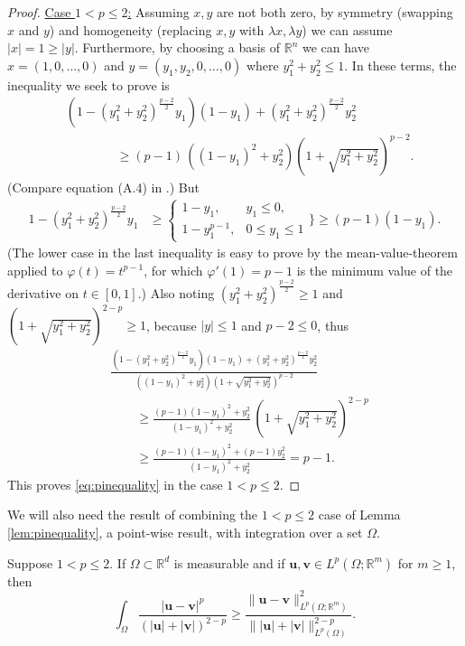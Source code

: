 \documentclass[final,leqno,onefignum,onetabnum]{siamltex1213bueler}
\newcommand\bu{\mathbf{u}}
\newcommand\bv{\mathbf{v}}
\newcommand\RR{\mathbb{R}}
\begin{document}
\begin{proof}
\medskip
\noindent \underline{Case $1 < p \le 2$:}  Assuming $x,y$ are not both zero, by symmetry (swapping $x$ and $y$) and homogeneity (replacing $x,y$ with $\lambda x,\lambda y$) we can assume $|x| = 1 \ge |y|$.  Furthermore, by choosing a basis of $\RR^n$ we can have $x=(1,0,\dots,0)$ and $y=(y_1,y_2,0,\dots,0)$ where $y_1^2+y_2^2 \le 1$.  In these terms, the inequality we seek to prove is
\begin{align*}
&\left(1 - (y_1^2+y_2^2)^{\frac{p-2}{2}} y_1\right) (1-y_1) + (y_1^2+y_2^2)^{\frac{p-2}{2}} y_2^2 \\
&\qquad\qquad \ge (p-1)\, \left((1-y_1)^2+y_2^2\right) \left(1 + \sqrt{y_1^2+y_2^2} \right)^{p-2}.
\end{align*}
(Compare equation (A.4) in \cite{Peral1997}.)  But
\begin{align*}
1 - (y_1^2+y_2^2)^{\frac{p-2}{2}} y_1
      &\ge \begin{cases} 1-y_1, & y_1 \le 0, \\
                        1-y_1^{p-1}, & 0 \le y_1 \le 1 \end{cases}\Bigg\}
      \ge (p-1) (1-y_1).
\end{align*}
(The lower case in the last inequality is easy to prove by the mean-value-theorem applied to $\varphi(t)=t^{p-1}$, for which $\varphi'(1)=p-1$ is the minimum value of the derivative on $t\in[0,1]$.)  Also noting $(y_1^2+y_2^2)^{\frac{p-2}{2}} \ge 1$ and $\left(1 + \sqrt{y_1^2+y_2^2} \right)^{2-p} \ge 1$, because $|y|\le 1$ and $p-2\le 0$, thus
\begin{align*}
&\frac{\left(1 - (y_1^2+y_2^2)^{\frac{p-2}{2}} y_1\right) (1-y_1) + (y_1^2+y_2^2)^{\frac{p-2}{2}} y_2^2}
      {\left((1-y_1)^2+y_2^2\right) \left(1 + \sqrt{y_1^2+y_2^2} \right)^{p-2}} \\
&\qquad \ge \frac{(p-1) (1-y_1)^2 + y_2^2}
      {(1-y_1)^2+y_2^2} \,  \left(1 + \sqrt{y_1^2+y_2^2} \right)^{2-p} \\
&\qquad \ge \frac{(p-1) (1-y_1)^2 + (p-1) y_2^2}{(1-y_1)^2+y_2^2} = p-1.
\end{align*}
This proves \eqref{eq:pinequality} in the case $1<p\le 2$.
\end{proof}

We will also need the result of combining the $1<p\le 2$ case of Lemma \ref{lem:pinequality}, a point-wise result, with integration over a set $\Omega$.

\begin{lemma} \label{lem:smallpbound}  Suppose $1<p\le 2$.  If $\Omega \subset \RR^d$ is measurable and if $\bu,\bv\in L^p(\Omega; \RR^m)$ for $m\ge 1$, then
\begin{equation}
    \int_\Omega \frac{|\bu-\bv|^p}{\left(|\bu|+|\bv|\right)^{2-p}} \ge \frac{\|\bu-\bv\|_{L^p(\Omega; \RR^m)}^2}{\big\||\bu|+|\bv|\big\|_{L^p(\Omega)}^{2-p}}. \label{eq:smallpbound}
\end{equation}
\end{lemma}
\end{document}
